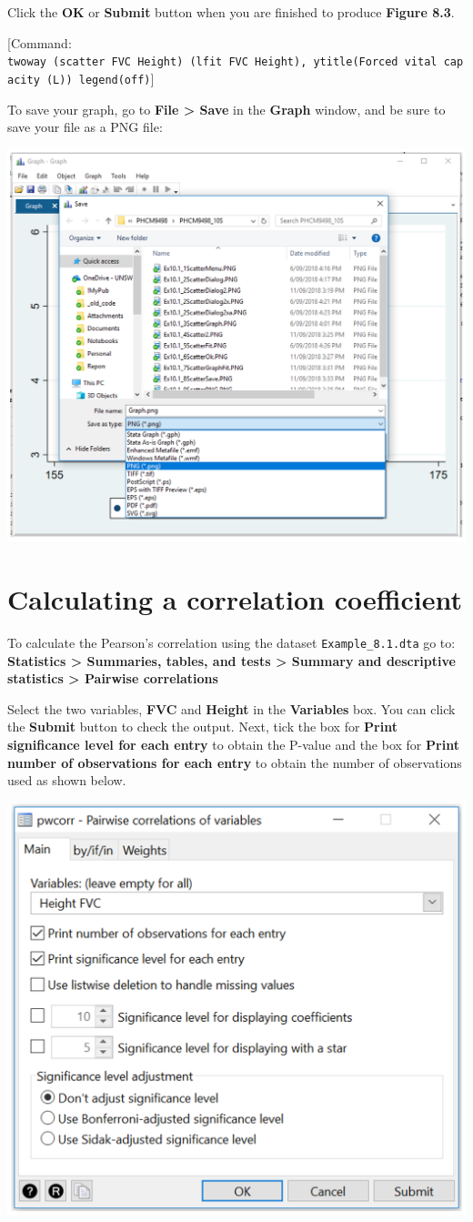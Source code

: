 \documentclass[
]{memoir}
\begin{document}
Click the \textbf{OK} or \textbf{Submit} button when you are finished to produce \textbf{Figure 8.3}.

{[}Command: \texttt{twoway\ (scatter\ FVC\ Height)\ (lfit\ FVC\ Height),\ ytitle(Forced\ vital\ capacity\ (L))\ legend(off)}{]}

To save your graph, go to \textbf{File \textgreater{} Save} in the \textbf{Graph} window, and be sure to save your file as a PNG file:

\includegraphics[width=0.66\linewidth]{img/mod08/stata/twoway-7}

\hypertarget{calculating-a-correlation-coefficient}{%
\section{Calculating a correlation coefficient}\label{calculating-a-correlation-coefficient}}

To calculate the Pearson's correlation using the dataset \texttt{Example\_8.1.dta} go to: \textbf{Statistics \textgreater{} Summaries, tables, and tests \textgreater{} Summary and descriptive statistics \textgreater{} Pairwise correlations}

Select the two variables, \textbf{FVC} and \textbf{Height} in the \textbf{Variables} box. You can click the \textbf{Submit} button to check the output. Next, tick the box for \textbf{Print significance level for each entry} to obtain the P-value and the box for \textbf{Print number of observations for each entry} to obtain the number of observations used as shown below.

\includegraphics[width=0.66\linewidth]{img/mod08/stata/corr-1}
\end{document}
